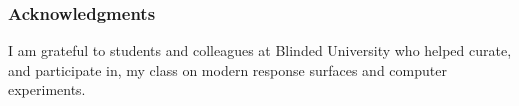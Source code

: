 \documentclass[12pt]{article}
\begin{document}
\subsubsection*{Acknowledgments}

I am grateful to  students and colleagues at Blinded University who helped curate,
and participate in, my class on modern response surfaces and computer
experiments.



\end{document}
